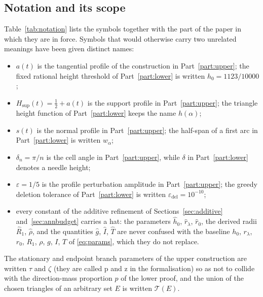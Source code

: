 \documentclass[11pt]{article}
\theoremstyle{plain}
\theoremstyle{definition}
\theoremstyle{remark}
\newcommand{\Hsup}{H_{\mathrm{sup}}}
\newcommand{\epsdel}{\varepsilon_{\mathrm{del}}}
\newcommand{\Tri}{\mathcal{T}}
\newcommand{\lean}[1]{%
  \begingroup\ttfamily\hyphenchar\font=-1\relax
  \def\_{\textunderscore\allowbreak}%
  #1\endgroup}
\begin{document}
\subsection{Notation and its scope}

Table~\ref{tab:notation} lists the symbols together with the part of the paper
in which they are in force. Symbols that would otherwise carry two unrelated
meanings have been given distinct names:

\begin{itemize}
  \item $a(t)$ is the tangential profile of the construction in
    Part~\ref{part:upper}; the fixed rational height threshold of
    Part~\ref{part:lower} is written $h_{0}=1123/10000$;
  \item $\Hsup(t)=\tfrac12+a(t)$ is the support profile in
    Part~\ref{part:upper}; the triangle height function of
    Part~\ref{part:lower} keeps the name $h(\alpha)$;
  \item $s(t)$ is the normal profile in Part~\ref{part:upper}; the half-span of
    a first arc in Part~\ref{part:lower} is written $w_{\alpha}$;
  \item $\delta_{n}=\pi/n$ is the cell angle in Part~\ref{part:upper}, while
    $\delta$ in Part~\ref{part:lower} denotes a needle height;
  \item $\varepsilon=1/5$ is the profile perturbation amplitude in
    Part~\ref{part:upper}; the greedy deletion tolerance of
    Part~\ref{part:lower} is written $\epsdel=10^{-10}$;
  \item every constant of the additive refinement of
    Sections~\ref{sec:additive} and~\ref{sec:annbudget} carries a hat: the
    parameters $\hat h_{0}$, $\hat r_{\lambda}$, $\hat r_{0}$, the derived
    radii $\hat R_{1}$, $\hat\rho$, and the quantities $\hat g$, $\hat I$,
    $\hat T$ are never confused with the baseline $h_{0}$, $r_{\lambda}$,
    $r_{0}$, $R_{1}$, $\rho$, $g$, $I$, $T$ of \eqref{eq:params}, which they do
    not replace.
\end{itemize}
The stationary and endpoint branch parameters of the upper construction are
written $\tau$ and $\zeta$ (they are called \lean{p} and \lean{z} in the
formalisation) so as not to collide with the direction-mass proportion $p$ of
the lower proof, and the union of the chosen triangles of an arbitrary set $E$
is written $\Tri(E)$.
\end{document}
